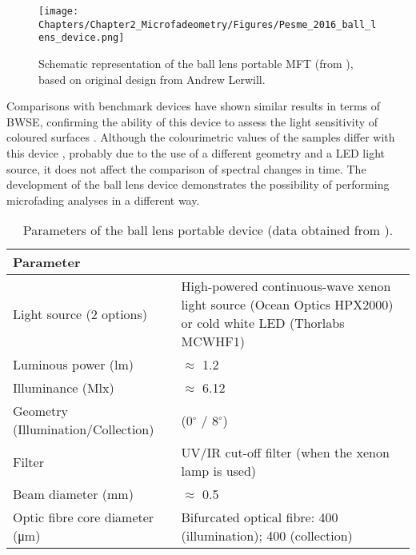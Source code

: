 \begin{figure*}[!h]
\centering
\texttt{[image: Chapters/Chapter2\_Microfadeometry/Figures/Pesme\_2016\_ball\_lens\_device.png]}
\caption[\hspace{0.3cm}The ball lens portable MFT]{Schematic representation of the ball lens portable MFT (from \citet[121]{pesme_development_2016}), based on original design from Andrew Lerwill.}
\label{fig:MFT_ball_lens}
\end{figure*}

Comparisons with benchmark devices have shown similar results in terms of \gls{BWSE}, confirming the ability of this device to assess the light sensitivity of coloured surfaces \citep[124]{pesme_development_2016}. Although the colourimetric values of the samples differ with this device \citep[125-6]{pesme_development_2016}, probably due to the use of a different geometry and a \gls{LED} light source, it does not affect the comparison of spectral changes in time. The development of the ball lens device demonstrates the possibility of performing microfading analyses in a different way.\\

\begin{table*}
\centering %
\caption[\hspace{0.3cm}Parameters of the ball lens portable device]{Parameters of the ball lens portable device (data obtained from \cite[120]{pesme_development_2016}).}
\begin{tabular}{R{5.5cm}L{7cm}}
\toprule[0.4mm]
\textbf{Parameter} &  \\\midrule
Light source (2 options) & High-powered continuous-wave xenon light source (Ocean Optics HPX2000) or cold white LED (Thorlabs MCWHF1) \\
Luminous power (\unit{\lumen}) & $\approx$ 1.2 \\
Illuminance (\unit{\mega\lux}) & $\approx$ 6.12 \\
Geometry (Illumination/Collection) & (0$^\circ$ / 8$^\circ$) \\
Filter & UV/IR cut-off filter (when the xenon lamp is used) \\
Beam diameter (\unit{\mm}) & $\approx$ 0.5\\
Optic fibre core diameter (\unit{\um}) & Bifurcated optical fibre: 400 (illumination); 400 (collection) \\
\bottomrule[0.4mm]
\end{tabular}
\label{tab:MFT_ball-lens}
\end{table*}


